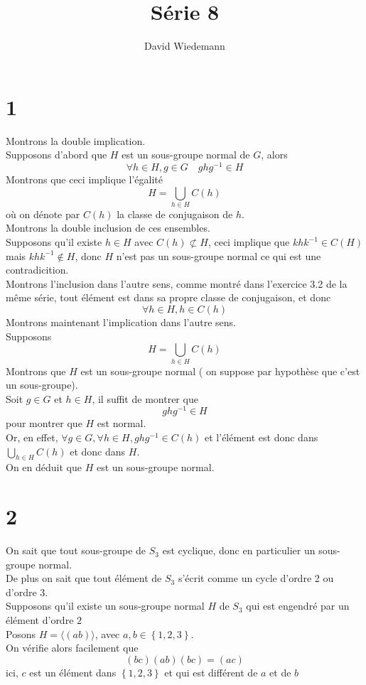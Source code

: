 \documentclass[11pt, a4paper, twoside]{article}
\begin{document}
\title{Série 8}
\author{David Wiedemann}
\maketitle
\section*{1}
Montrons la double implication.\\
Supposons d'abord que $H$ est un sous-groupe normal de $G$, alors
\[ 
\forall h \in H, g \in G\quad ghg^{-1} \in H
\]
Montrons que ceci implique l'égalité 
\[ 
	H = \bigcup_{h \in H} C( h) 
\]
où on dénote par $C( h) $ la classe de conjugaison de $h$.\\
Montrons la double inclusion de ces ensembles.\\

Supposons qu'il existe $h \in H$ avec  $C( h) \not\subset H $, ceci implique que $khk^{-1} \in C( H) $ mais $khk^{-1} \notin H$, donc $H$ n'est pas un sous-groupe normal ce qui est une contradicition.\\
Montrons l'inclusion dans l'autre sens, comme montré dans l'exercice 3.2 de la même série, tout élément est dans sa propre classe de conjugaison, et donc
 \[ 
\forall	 h \in H, h \in C( h) 
\]
Montrons maintenant l'implication dans l'autre sens.\\
Supposons 
\[ 
	H = \bigcup_{h \in H} C( h) 
\]
Montrons que $H$ est un sous-groupe normal ( on suppose par hypothèse que c'est un sous-groupe).\\
Soit $g \in G$ et $h \in H$, il suffit de montrer que 
\[ 
ghg^{-1}\in H
\]
pour montrer que $H$ est normal.\\
Or, en effet, $ \forall g \in G, \forall h \in H, ghg^{-1}\in C( h) $ et l'élément est donc dans $\bigcup_{h \in H} C( h) $ et donc dans $H$.\\
On en déduit que $H$ est un sous-groupe normal.
\section*{2}
On sait que tout sous-groupe de $S_3$ est cyclique, donc en particulier un sous-groupe normal.\\
De plus on sait que tout élément de $S_3$ s'écrit comme un cycle d'ordre 2 ou d'ordre 3.\\
Supposons qu'il existe un sous-groupe normal $H$ de $S_3$ qui est engendré par un élément d'ordre $2$ \\
Posons $H = \langle ( ab) \rangle$,  avec $a,b \in \left\{ 1,2,3 \right\} $.\\
On vérifie alors facilement que
\[ 
	( bc) ( ab) ( bc) = ( ac) 
\]
ici, $c$ est un élément dans $ \left\{ 1,2,3 \right\} $ et qui est différent de $a$ et de $b$ 
\end{document}
